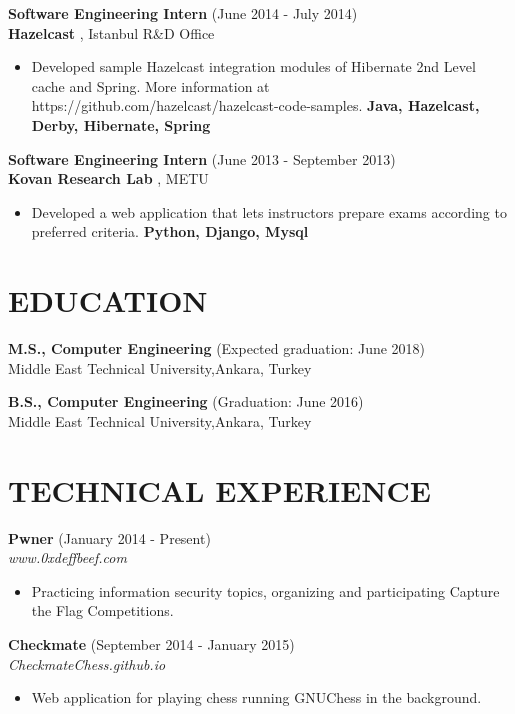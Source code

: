 \documentclass[margin, 10pt]{res} %
\begin{document}
\begin{resume}
{\bf Software Engineering Intern} \hfill (June 2014 - July 2014) \\
{\bf Hazelcast }, Istanbul R\&D Office
\begin{itemize} 
\item Developed sample Hazelcast integration modules of Hibernate 2nd Level cache and Spring. More information at https://github.com/hazelcast/hazelcast-code-samples. {\bf Java, Hazelcast, Derby, Hibernate, Spring }
\end{itemize} 

{\bf Software Engineering Intern} \hfill (June 2013 - September 2013) \\
{\bf Kovan Research Lab }, METU
\begin{itemize}
\item Developed a web application that lets instructors prepare exams according to preferred criteria. {\bf Python, Django, Mysql }
\end{itemize} 





\section{EDUCATION}

{\bf M.S., Computer Engineering } \hfill {(Expected graduation: June 2018)}\\
Middle East Technical University,Ankara, Turkey

{\bf B.S., Computer Engineering } \hfill {(Graduation: June 2016)}\\
Middle East Technical University,Ankara, Turkey


\section{TECHNICAL EXPERIENCE}

{\bf Pwner} \hfill (January 2014 - Present) \\
\textit{www.0xdeffbeef.com}
\begin{itemize} 
\item Practicing information security topics, organizing and participating Capture the Flag Competitions. 
\end{itemize} 

{\bf Checkmate} \hfill (September 2014 - January 2015) \\
\textit{CheckmateChess.github.io}
\begin{itemize} 
\item Web application for playing chess running GNUChess in the background.
\end{itemize} 


\end{resume}
\end{document}
